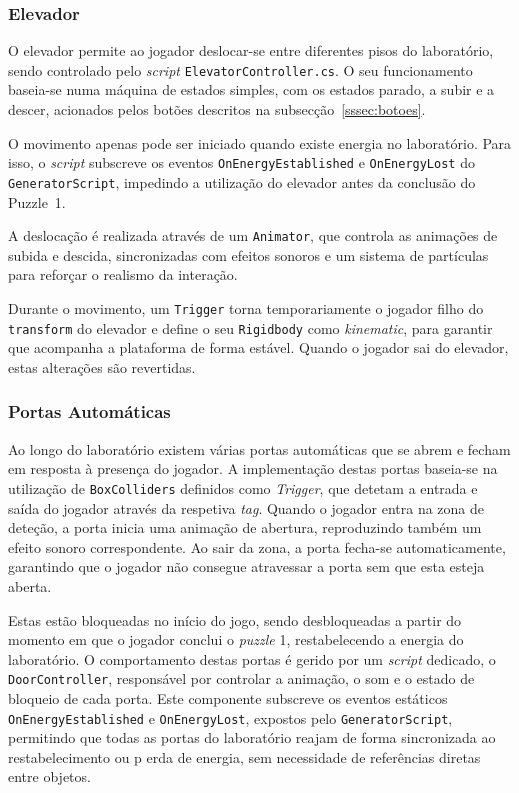 \documentclass[a4paper, 12pt]{book}
\begin{document}
\subsubsection{Elevador}

O elevador permite ao jogador deslocar-se entre diferentes pisos do laboratório,
sendo controlado pelo \textit{script} \texttt{ElevatorController.cs}. O seu funcionamento
baseia-se numa máquina de estados simples, com os estados parado, a subir e a descer,
acionados pelos botões descritos na subsecção~\ref{sssec:botoes}.

O movimento apenas pode ser iniciado quando existe energia no laboratório. Para isso,
o \textit{script} subscreve os eventos \texttt{OnEnergyEstablished} e
\texttt{OnEnergyLost} do \texttt{GeneratorScript}, impedindo a utilização do elevador
antes da conclusão do Puzzle~1.

A deslocação é realizada através de um \texttt{Animator}, que controla as animações de
subida e descida, sincronizadas com efeitos sonoros e um sistema de partículas para
reforçar o realismo da interação.

Durante o movimento, um \texttt{Trigger} torna temporariamente o jogador filho do
\texttt{transform} do elevador e define o seu \texttt{Rigidbody} como
\textit{kinematic}, para garantir que acompanha a plataforma de forma estável. Quando o
jogador sai do elevador, estas alterações são revertidas.

\subsubsection{Portas Automáticas}\label{sssec:portas-automaticas}
Ao longo do laboratório existem várias portas automáticas que se abrem e fecham em resposta à presença do jogador. 
A implementação destas portas baseia-se na utilização de \texttt{BoxColliders} definidos como \textit{Trigger}, que 
detetam a entrada e saída do jogador através da respetiva \textit{tag}. Quando o jogador entra na zona de deteção,
 a porta inicia uma animação de abertura, reproduzindo também um efeito sonoro correspondente. 
 Ao sair da zona, a porta fecha-se automaticamente, garantindo que o jogador não consegue atravessar a porta sem que esta esteja aberta.

Estas estão bloqueadas no início do jogo, sendo desbloqueadas a partir do momento em que o jogador conclui o \textit{puzzle} 1, 
restabelecendo a energia do laboratório. O comportamento destas portas é gerido por um \textit{script} dedicado, o 
\texttt{DoorController}, responsável por controlar a animação, o som e o estado de bloqueio de cada porta. 
Este componente subscreve os eventos estáticos \texttt{OnEnergyEstablished} e \texttt{OnEnergyLost}, expostos pelo 
\texttt{GeneratorScript}, permitindo que todas as portas do laboratório reajam de forma sincronizada ao restabelecimento ou p
erda de energia, sem necessidade de referências diretas entre objetos.
\end{document}
